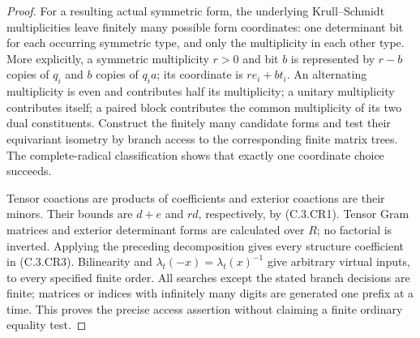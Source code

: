 \begin{proof}
For a resulting actual symmetric form, the underlying
Krull--Schmidt multiplicities leave finitely many
possible form coordinates: one determinant bit
for each occurring symmetric type, and only
the multiplicity in each other type. More explicitly,
a symmetric multiplicity $r>0$ and bit $b$ is represented
by $r-b$ copies of $q_i$ and $b$ copies of $q_i a$;
its coordinate is $r e_i+b t_i$.
An alternating multiplicity is even and contributes
half its multiplicity; a unitary multiplicity
contributes itself; a paired block contributes
the common multiplicity of its two dual constituents.
Construct the finitely many candidate forms and
test their equivariant isometry by branch access
to the corresponding finite matrix trees.
The complete-radical classification shows that
exactly one coordinate choice succeeds.

Tensor coactions are products of coefficients and
exterior coactions are their minors. Their bounds
are $d+e$ and $rd$, respectively, by (C.3.CR1).
Tensor Gram matrices and exterior determinant forms
are calculated over $R$; no factorial is inverted.
Applying the preceding decomposition gives every
structure coefficient in (C.3.CR3).
Bilinearity and
$\lambda_t(-x)=\lambda_t(x)^{-1}$ give arbitrary
virtual inputs, to every specified finite order.
All searches except the stated branch decisions
are finite; matrices or indices with infinitely
many digits are generated one prefix at a time.
This proves the precise access assertion without
claiming a finite ordinary equality test.
\end{proof}

